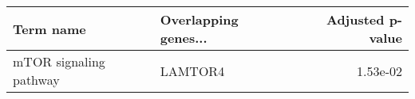 \begin{tabular}{llr}
\toprule
             Term name & Overlapping genes... &  Adjusted p-value \\
\midrule
mTOR signaling pathway &              LAMTOR4 &          1.53e-02 \\
\bottomrule
\end{tabular}
